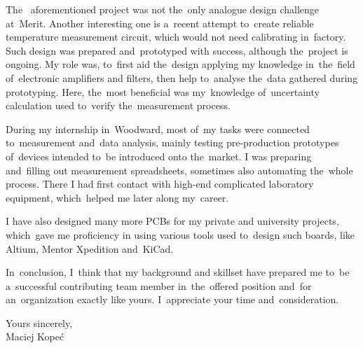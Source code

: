 \documentclass[11pt,a4paper,sans]{article}
\begin{document}
	The~ aforementioned project was not the~only analogue design challenge at~Merit. Another 
	interesting one is a~recent
	attempt to~create reliable temperature measurement circuit, which would not need calibrating
	in~factory. Such design was prepared and~prototyped with success, although the~project is 
	ongoing. My role was, to~first aid the~design applying my knowledge 
	in~the~field of~electronic amplifiers and filters, then help to~analyse the~data gathered
	during prototyping. Here, the~most beneficial was my~knowledge of~uncertainty calculation used 
	to~verify the~measurement process.

	During my internship in~Woodward, most of~my tasks were connected to~measurement and~data
	analysis, mainly testing pre-production prototypes of~devices intended to~be introduced onto
	the~market. I was preparing and~filling out measurement spreadsheets, sometimes also automating
	the~whole process. There I had first contact with high-end complicated laboratory equipment,
	which~helped me later along my~career.
	
	I have also designed many more PCBs for my private and university projects, which~gave me
	proficiency in using various tools used to~design such boards, like Altium, Mentor Xpedition
	and~KiCad.
	
	In~conclusion, I~think that my background and skillset have prepared me to~be a~successful 
	contributing team member in~the~offered position and~for an~organization exactly like 
	yours. I~appreciate your time and~consideration.

	\vspace{1\baselineskip}
	\hfill
	\begin{minipage}{0.3\linewidth}
		\begin{flushleft}
			Yours sincerely,
			\\\vspace{3\baselineskip}
			Maciej Kopeć
		\end{flushleft}
	\end{minipage}
	
\end{document}
